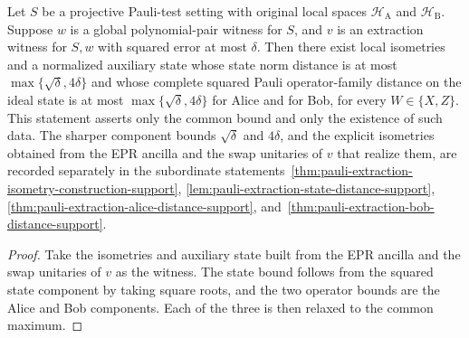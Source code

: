 \begin{theorem}
  \label{thm:pauli-concrete-isometry-transfer-support}
  \leanok
  Let $S$ be a projective Pauli-test setting with original local spaces
  $\mathcal H_{\mathrm A}$ and $\mathcal H_{\mathrm B}$. Suppose $w$ is a
  global polynomial-pair witness for $S$, and $v$ is an extraction witness
  for $S,w$ with squared error at most $\delta$. Then there exist local
  isometries and a normalized auxiliary state whose state norm distance is at
  most $\max\{\sqrt\delta,4\delta\}$ and whose complete squared Pauli
  operator-family distance on the ideal state is at most
  $\max\{\sqrt\delta,4\delta\}$ for Alice and for Bob, for every
  $W\in\{X,Z\}$. This statement asserts only the common bound and only the
  existence of such data. The sharper component bounds $\sqrt\delta$ and
  $4\delta$, and the explicit isometries obtained from the EPR ancilla and the
  swap unitaries of $v$ that realize them, are recorded separately in the
  subordinate statements~\ref{thm:pauli-extraction-isometry-construction-support},
  \ref{lem:pauli-extraction-state-distance-support},
  \ref{thm:pauli-extraction-alice-distance-support},
  and~\ref{thm:pauli-extraction-bob-distance-support}.
\end{theorem}
\begin{proof}
  \leanok
  Take the isometries and auxiliary state built from the EPR ancilla and the
  swap unitaries of $v$ as the witness. The state bound follows from the
  squared state component by taking square roots, and the two operator bounds
  are the Alice and Bob components. Each of the three is then relaxed to the
  common maximum.
\end{proof}

